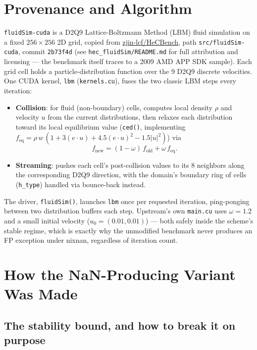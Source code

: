 \documentclass[11pt,a4paper]{article}
\begin{document}
\section{Provenance and Algorithm}

\texttt{fluidSim-cuda} is a D2Q9 Lattice-Boltzmann Method (LBM) fluid
simulation on a fixed $256\times256$ 2D grid, copied from
\href{https://github.com/zjin-lcf/HeCBench}{zjin-lcf/HeCBench},
path \texttt{src/fluidSim-cuda}, commit \texttt{2b73f4d} (see
\texttt{hec\_fluidSim/\allowbreak README.md} for full attribution and licensing ---
the benchmark itself traces to a 2009 AMD APP SDK sample). Each grid cell
holds a particle-distribution function over the 9 D2Q9 discrete
velocities. One CUDA kernel, \texttt{lbm} (\texttt{kernels.cu}), fuses the
two classic LBM steps every iteration:

\begin{itemize}
  \item \textbf{Collision}: for fluid (non-boundary) cells, computes local
    density $\rho$ and velocity $u$ from the current distributions, then
    relaxes each distribution toward its local equilibrium value
    (\texttt{ced()}, implementing
    $f_{\mathrm{eq}} = \rho\, w\,(1 + 3(e{\cdot}u) + 4.5(e{\cdot}u)^2 -
    1.5|u|^2)$) via
    \[
    f_{\mathrm{new}} = (1-\omega)\,f_{\mathrm{old}} + \omega\,f_{\mathrm{eq}}.
    \]
  \item \textbf{Streaming}: pushes each cell's post-collision values to
    its 8 neighbors along the corresponding D2Q9 direction, with the
    domain's boundary ring of cells (\texttt{h\_type}) handled via
    bounce-back instead.
\end{itemize}

The driver, \texttt{fluidSim()}, launches \texttt{lbm} once per requested
iteration, ping-ponging between two distribution buffers each step.
Upstream's own \texttt{main.cu} uses $\omega = 1.2$ and a small initial
velocity ($u_0 = (0.01, 0.01)$) --- both safely inside the scheme's stable
regime, which is exactly why the unmodified benchmark never produces an
FP exception under nixnan, regardless of iteration count.

\section{How the NaN-Producing Variant Was Made}
\label{sec:mechanism}

\subsection{The stability bound, and how to break it on purpose}
\end{document}
